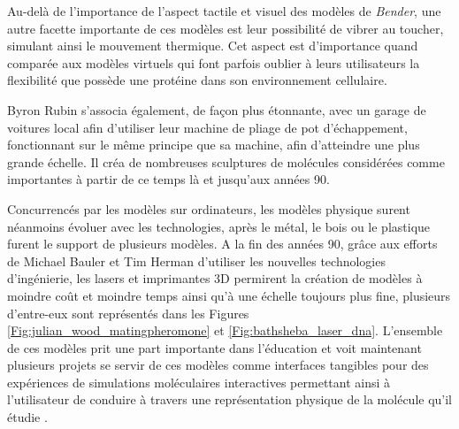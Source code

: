 Au-delà de l'importance de l'aspect tactile et visuel des modèles de \textit{Bender}, une autre facette importante de ces modèles est leur possibilité de vibrer au toucher, simulant ainsi le mouvement thermique. Cet aspect est d'importance quand comparée aux modèles virtuels qui font parfois oublier à leurs utilisateurs la flexibilité que possède une protéine dans son environnement cellulaire. 

Byron Rubin s'associa également, de façon plus étonnante, avec un garage de voitures local afin d'utiliser leur machine de pliage de pot d'échappement, fonctionnant sur le même principe que sa machine, afin d'atteindre une plus grande échelle. Il créa de nombreuses sculptures de molécules considérées comme importantes à partir de ce temps là et jusqu'aux années 90.

Concurrencés par les modèles sur ordinateurs, les modèles physique surent néanmoins évoluer avec les technologies, après le métal, le bois ou le plastique furent le support de plusieurs modèles. A la fin des années 90, grâce aux efforts de Michael Bauler et Tim Herman d'utiliser les nouvelles technologies d’ingénierie, les lasers et imprimantes 3D permirent la création de modèles à moindre coût et moindre temps ainsi qu'à une échelle toujours plus fine, plusieurs d'entre-eux sont représentés dans les Figures \ref{Fig:julian_wood_matingpheromone} et \ref{Fig:bathsheba_laser_dna}. L'ensemble de ces modèles prit une part importante dans l'éducation et voit maintenant plusieurs projets se servir de ces modèles comme interfaces tangibles pour des expériences de simulations moléculaires interactives permettant ainsi à l'utilisateur de conduire à travers une représentation physique de la molécule qu'il étudie \cite{gillet2005tangible}.


